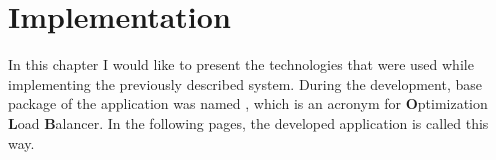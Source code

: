 \chapter{Implementation}\label{ch:used-technologies}
In this chapter I would like to present the technologies that were used while implementing the previously described system.
During the development,
base package of the application was named ,
which is an acronym for \textbf{O}ptimization \textbf{L}oad \textbf{B}alancer.
In the following pages, 
the developed application is called this way.







